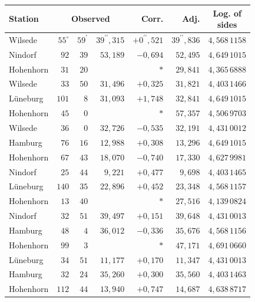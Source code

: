 \begin{center}\small\setlength{\tabcolsep}{5pt}\renewcommand{\arraystretch}{1.04}
\begin{tabular}{|l|r@{\;}r@{\;}r|r|r|c|}\hline
Station & \multicolumn{3}{c|}{Observed} & Corr. & Adj. & \shortstack{\rule{0pt}{2.4ex}Log. of\\sides}\\\hline
Wilsede & $55^{\circ}$ & $59^{\prime}$ & $39^{\prime\prime}{,}315$ & $+0^{\prime\prime}{,}521$ & $39^{\prime\prime}{,}836$ & $4{,}568\,1158$\\
Nindorf & $92$ & $39$ & $53{,}189$ & $-0{,}694$ & $52{,}495$ & $4{,}649\,1015$\\
Hohenhorn & $31$ & $20$ &  & $*$ & $29{,}841$ & $4{,}365\,6888$\\[3pt]
Wilsede & $33$ & $50$ & $31{,}496$ & $+0{,}325$ & $31{,}821$ & $4{,}403\,1466$\\
Lüneburg & $101$ & $8$ & $31{,}093$ & $+1{,}748$ & $32{,}841$ & $4{,}649\,1015$\\
Hohenhorn & $45$ & $0$ &  & $*$ & $57{,}357$ & $4{,}506\,9703$\\[3pt]
Wilsede & $36$ & $0$ & $32{,}726$ & $-0{,}535$ & $32{,}191$ & $4{,}431\,0012$\\
Hamburg & $76$ & $16$ & $12{,}988$ & $+0{,}308$ & $13{,}296$ & $4{,}649\,1015$\\
Hohenhorn & $67$ & $43$ & $18{,}070$ & $-0{,}740$ & $17{,}330$ & $4{,}627\,9981$\\[3pt]
Nindorf & $25$ & $44$ & $9{,}221$ & $+0{,}477$ & $9{,}698$ & $4{,}403\,1465$\\
Lüneburg & $140$ & $35$ & $22{,}896$ & $+0{,}452$ & $23{,}348$ & $4{,}568\,1157$\\
Hohenhorn & $13$ & $40$ &  & $*$ & $27{,}516$ & $4{,}139\,0824$\\[3pt]
Nindorf & $32$ & $51$ & $39{,}497$ & $+0{,}151$ & $39{,}648$ & $4{,}431\,0013$\\
Hamburg & $48$ & $4$ & $36{,}012$ & $-0{,}336$ & $35{,}676$ & $4{,}568\,1156$\\
Hohenhorn & $99$ & $3$ &  & $*$ & $47{,}171$ & $4{,}691\,0660$\\[3pt]
Lüneburg & $34$ & $51$ & $11{,}177$ & $+0{,}170$ & $11{,}347$ & $4{,}431\,0013$\\
Hamburg & $32$ & $24$ & $35{,}260$ & $+0{,}300$ & $35{,}560$ & $4{,}403\,1463$\\
Hohenhorn & $112$ & $44$ & $13{,}940$ & $+0{,}747$ & $14{,}687$ & $4{,}638\,8717$\\
\end{tabular}\end{center}

